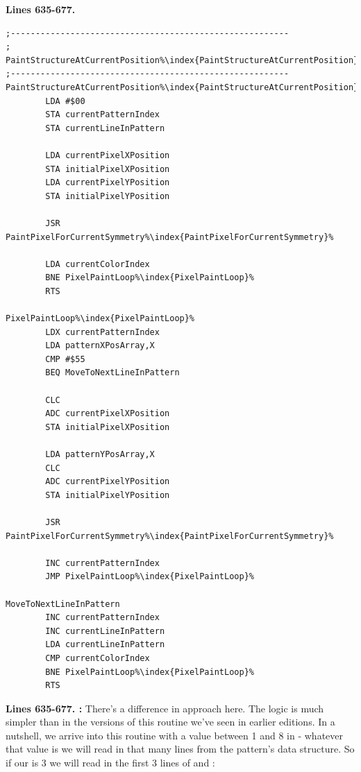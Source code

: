 \clearpage
\textbf{Lines 635-677. } 
\begin{lstlisting}[caption = All the pattern data structures in Psychedelia organized into a set of arrays.,escapechar=\%]
;--------------------------------------------------------
; PaintStructureAtCurrentPosition%\index{PaintStructureAtCurrentPosition}%
;--------------------------------------------------------
PaintStructureAtCurrentPosition%\index{PaintStructureAtCurrentPosition}%   
        LDA #$00
        STA currentPatternIndex
        STA currentLineInPattern

        LDA currentPixelXPosition
        STA initialPixelXPosition
        LDA currentPixelYPosition
        STA initialPixelYPosition

        JSR PaintPixelForCurrentSymmetry%\index{PaintPixelForCurrentSymmetry}%

        LDA currentColorIndex
        BNE PixelPaintLoop%\index{PixelPaintLoop}%
        RTS 

PixelPaintLoop%\index{PixelPaintLoop}%   
        LDX currentPatternIndex
        LDA patternXPosArray,X
        CMP #$55
        BEQ MoveToNextLineInPattern

        CLC 
        ADC currentPixelXPosition
        STA initialPixelXPosition

        LDA patternYPosArray,X
        CLC 
        ADC currentPixelYPosition
        STA initialPixelYPosition

        JSR PaintPixelForCurrentSymmetry%\index{PaintPixelForCurrentSymmetry}%

        INC currentPatternIndex
        JMP PixelPaintLoop%\index{PixelPaintLoop}%

MoveToNextLineInPattern   
        INC currentPatternIndex
        INC currentLineInPattern
        LDA currentLineInPattern
        CMP currentColorIndex
        BNE PixelPaintLoop%\index{PixelPaintLoop}%
        RTS 
\end{lstlisting}
\clearpage

\textbf{Lines 635-677. :} There's a difference in approach here.
The logic is much simpler than in the versions of this routine we've seen in earlier editions. In a nutshell, we
arrive into this routine with a value between 1 and 8 in  - whatever that value is we will
read in that many lines from the pattern's data structure.  So if our  is 3 we will
read in the first 3 lines of  and :

